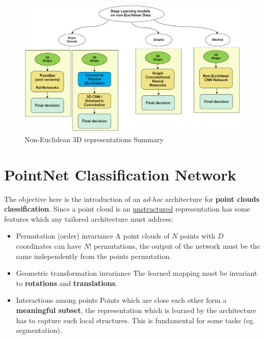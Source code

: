 \begin{figure}
    \centering
    \includegraphics[scale=0.6]{img/NonEuclideanSummary.png}
    \caption{Non-Euclidean 3D representations Summary}
\end{figure}

\section{PointNet Classification Network}
The objective here is the introduction of an \textit{ad-hoc} architecture for \textbf{point clouds classification}. Since a point cloud is an \underline{unstructured} representation has some features which any tailored architecture must address:
\begin{itemize}
    \itemsep-0.3em
    \item \textsf{Permutation (order) invariance} A point clouds of $N$ points with $D$ coordinates can have $N!$ permutations, the output of the network must be the same independently from the points permutation.
    \item  \textsf{Geometric transformation invariance} The learned mapping must be invariant to \textbf{rotations} and \textbf{translations}.
    \item \textsf{Interactions among points} Points which are close each other form a \textbf{meaningful subset}, the representation which is learned by the architecture has to capture such local structures. This is fundamental for some tasks (eg. segmentation).
\end{itemize}

